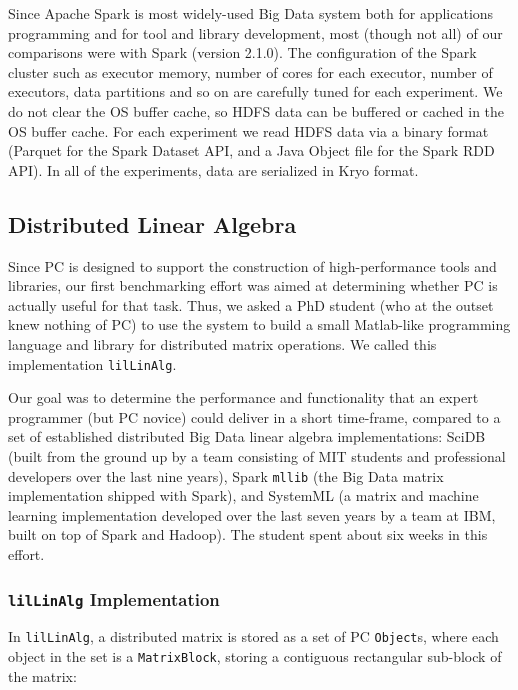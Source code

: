Since Apache Spark is most widely-used Big Data system both for applications programming and for tool and library
development, most
(though not all) of our comparisons were with Spark (version
2.1.0). The configuration of the Spark cluster such as
executor memory, number of cores for each executor, number of
executors, data partitions and so on are carefully tuned for each
experiment. We do not clear the OS buffer cache, so HDFS data can be buffered or
cached in the OS buffer cache. For each experiment we read HDFS data
via a binary format (Parquet for the Spark Dataset API,
and a Java Object file for the Spark RDD API).  In all of the
experiments, data are serialized in Kryo format. 


\subsection {Distributed Linear Algebra}

Since PC is designed to support the construction
of high-performance tools and libraries, our first benchmarking effort was aimed at determining 
whether PC is actually useful for that task.  Thus, we asked
a PhD student (who at the outset knew nothing of PC) 
to use the system to build a small Matlab-like 
programming language and library for distributed matrix operations.
We called this implementation \texttt{lilLinAlg}.

Our goal was to determine the 
performance and functionality that an expert programmer (but PC novice) could deliver in a short
time-frame, compared to a set of established distributed Big Data linear algebra implementations:
SciDB \cite{brown2010overview, stonebraker2011architecture} (built from the ground up by a team
consisting of MIT students and professional developers over the last
nine years), Spark \texttt{mllib} \cite{meng2016mllib} 
(the Big Data matrix
implementation shipped with Spark), and SystemML \cite{boehm2014hybrid, ghoting2011systemml, boehm2016systemml}
(a matrix and machine learning implementation developed
over the last seven years by a team at IBM, built on top of Spark and Hadoop).
The student spent about six weeks in this effort.

\subsubsection{\texttt{lilLinAlg} Implementation}

In \texttt{lilLinAlg}, a distributed matrix is stored as a set of PC \texttt{Object}s, where each 
object in the set is a \texttt{MatrixBlock}, storing a contiguous rectangular sub-block of the matrix:


